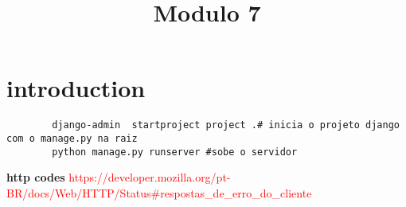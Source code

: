 \documentclass{article}
\date{} %
\title{Modulo 7}
\begin{document}
    \maketitle
    \tableofcontents
    \section{introduction}
    \begin{lstlisting}
        django-admin  startproject project .# inicia o projeto django com o manage.py na raiz
        python manage.py runserver #sobe o servidor
    \end{lstlisting}
    \textbf{http codes}
    \textcolor{red}{https://developer.mozilla.org/pt-BR/docs/Web/HTTP/Status#respostas_de_erro_do_cliente}
    


    

    
\end{document}
